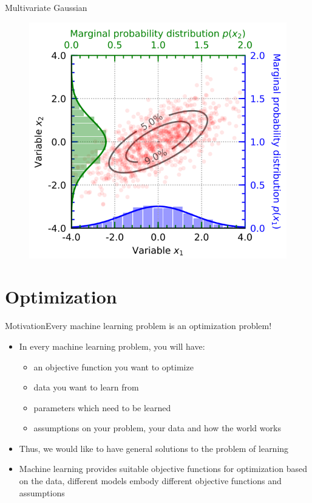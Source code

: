 \begin{frame}{Multivariate Gaussian}{}
	\begin{figure}
		\centering
		\includegraphics[scale=0.35]{02_math/02_img/multivariate_gaussian}
	\end{figure}
\end{frame}


\section{Optimization}

% 
\begin{frame}{Motivation}{Every machine learning problem is an optimization problem!}
	\begin{itemize}
		\item In every machine learning problem, you will have:
		\begin{itemize}
			\item an objective function you want to optimize
			\item data you want to learn from
			\item parameters which need to be learned
			\item assumptions on your problem, your data and how the world works
		\end{itemize}
		\item Thus, we would like to have general solutions to the problem of learning
		\item Machine learning provides suitable objective functions for optimization based on the data,
			different models embody different objective functions and assumptions
	\end{itemize}
\end{frame}

